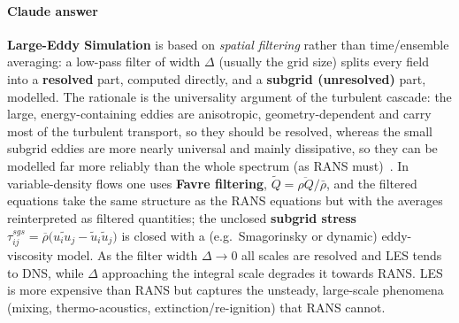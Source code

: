 {\color{istblue}
\paragraph{Claude answer}
\textbf{Large-Eddy Simulation} is based on \emph{spatial filtering} rather than time/ensemble averaging: a low-pass filter of width $\Delta$ (usually the grid size) splits every field into a \textbf{resolved} part, computed directly, and a \textbf{subgrid (unresolved)} part, modelled. The rationale is the universality argument of the turbulent cascade: the large, energy-containing eddies are anisotropic, geometry-dependent and carry most of the turbulent transport, so they should be resolved, whereas the small subgrid eddies are more nearly universal and mainly dissipative, so they can be modelled far more reliably than the whole spectrum (as RANS must)~\cite{pope2000turbulent,veynante2002turbulent,lecture10}. In variable-density flows one uses \textbf{Favre filtering}, $\tilde Q = \overline{\rho Q}/\bar\rho$, and the filtered equations take the same structure as the RANS equations but with the averages reinterpreted as filtered quantities; the unclosed \textbf{subgrid stress} $\tau_{ij}^{sgs} = \overline{\rho}\big(\widetilde{u_i u_j} - \tilde u_i \tilde u_j\big)$ is closed with a (e.g.\ Smagorinsky or dynamic) eddy-viscosity model. As the filter width $\Delta\to 0$ all scales are resolved and LES tends to DNS, while $\Delta$ approaching the integral scale degrades it towards RANS. LES is more expensive than RANS but captures the unsteady, large-scale phenomena (mixing, thermo-acoustics, extinction/re-ignition) that RANS cannot.

}
